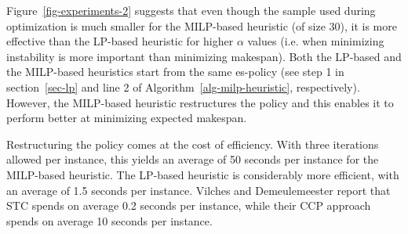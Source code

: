   	Figure~\ref{fig-experiments-2} suggests that
  	even though the sample used during optimization is much smaller
  	for the MILP-based heuristic (of size $30$),
  	it is more effective than the LP-based heuristic for higher $\alpha$ values
  	(i.e. when minimizing instability is  more important than minimizing makespan).
  	Both the LP-based and the MILP-based heuristics start from the same es-policy
  	(see step 1 in section~\ref{sec-lp} and line 2 of Algorithm~\ref{alg-milp-heuristic}, respectively).
  	However, the MILP-based heuristic restructures the policy and this enables
  	it to perform better at minimizing expected makespan.
  	
  	Restructuring the policy comes at the cost of efficiency.
   	With three iterations allowed per instance,
  	this yields an average of 50 seconds per instance for the MILP-based heuristic.
  	The LP-based heuristic is considerably more efficient, with an average of 1.5 seconds per instance.
  	Vilches and Demeulemeester report that STC spends on average 0.2 seconds per instance,
  	while their CCP approach spends on average 10 seconds per instance. 
 	

